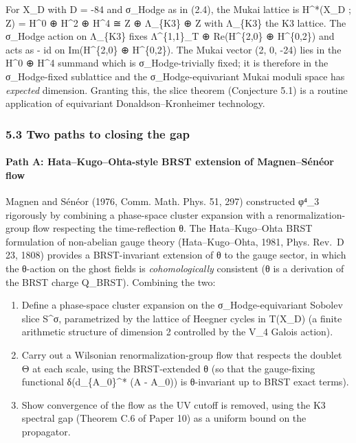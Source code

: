 \documentclass[
 11pt,
 a4paper,
]{article}
\begin{document}
For X\_D with D = -84 and σ\_Hodge as in (2.4), the Mukai lattice is H\^{}*(X\_D ; Z) = H\^{}0 ⊕ H\^{}2 ⊕ H\^{}4 ≅ Z ⊕ Λ\_\{K3\} ⊕ Z with Λ\_\{K3\} the K3 lattice. The σ\_Hodge action on Λ\_\{K3\} fixes Λ\^{}\{1,1\}\_T ⊕ Re(H\^{}\{2,0\} ⊕ H\^{}\{0,2\}) and acts as - id on Im(H\^{}\{2,0\} ⊕ H\^{}\{0,2\}). The Mukai vector (2, 0, -24) lies in the H\^{}0 ⊕ H\^{}4 summand which is σ\_Hodge-trivially fixed; it is therefore in the σ\_Hodge-fixed sublattice and the σ\_Hodge-equivariant Mukai moduli space has \emph{expected} dimension. Granting this, the slice theorem (Conjecture 5.1) is a routine application of equivariant Donaldson--Kronheimer technology.

\hypertarget{two-paths-to-closing-the-gap}{%
\subsubsection{5.3 Two paths to closing the gap}\label{two-paths-to-closing-the-gap}}

\hypertarget{path-a-hatakugoohta-style-brst-extension-of-magnensuxe9nuxe9or-flow}{%
\paragraph{Path A: Hata--Kugo--Ohta-style BRST extension of Magnen--Sénéor flow}\label{path-a-hatakugoohta-style-brst-extension-of-magnensuxe9nuxe9or-flow}}

Magnen and Sénéor (1976, Comm. Math. Phys. 51, 297) constructed φ⁴\_3 rigorously by combining a phase-space cluster expansion with a renormalization-group flow respecting the time-reflection θ. The Hata--Kugo--Ohta BRST formulation of non-abelian gauge theory (Hata--Kugo--Ohta, 1981, Phys. Rev.~D 23, 1808) provides a BRST-invariant extension of θ to the gauge sector, in which the θ-action on the ghost fields is \emph{cohomologically} consistent (θ is a derivation of the BRST charge Q\_BRST). Combining the two:

\begin{enumerate}
\def\labelenumi{(\roman{enumi})}
\item
 Define a phase-space cluster expansion on the σ\_Hodge-equivariant Sobolev slice S\^{}σ, parametrized by the lattice of Heegner cycles in T(X\_D) (a finite arithmetic structure of dimension 2 controlled by the V\_4 Galois action).
\item
 Carry out a Wilsonian renormalization-group flow that respects the doublet Θ at each scale, using the BRST-extended θ (so that the gauge-fixing functional δ(d\_\{A\_0\}\^{}* (A - A\_0)) is θ-invariant up to BRST exact terms).
\item
 Show convergence of the flow as the UV cutoff is removed, using the K3 spectral gap (Theorem C.6 of Paper 10) as a uniform bound on the propagator.
\end{enumerate}
\end{document}
